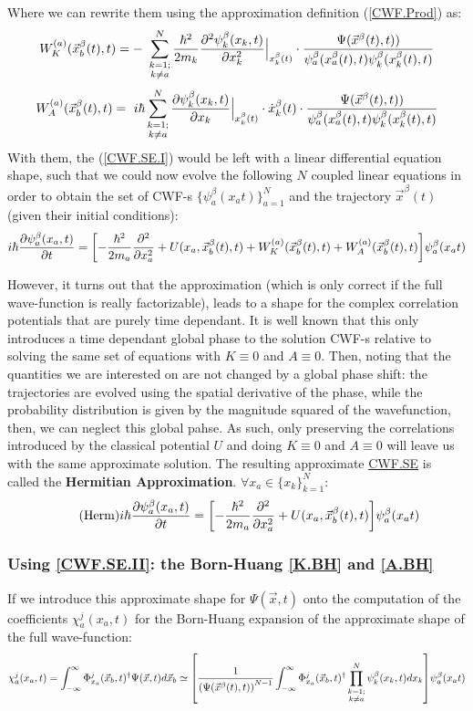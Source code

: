 \documentclass[11pt, a4paper]{article} %
\begin{document}
Where we can rewrite them using the approximation definition (\ref{CWF.Prod}) as:
$$
W^{(a)}_K(\vec{x}_b^\beta (t),t)=- \ \sum_{\substack{k=1; \\ k\neq a}}^{N} \frac{\hbar^2}{2m_k}\pdv[2]{\psi_k^\beta(x_k,t)}{x_k}\Big\rvert_{x_k^\beta(t)}\cdot\frac{\Psi(\vec{x}^\beta(t),t))}{\psi^\beta_a(x_a^\beta(t),t) \psi^\beta_k(x_k^\beta(t),t)} 
$$
$$
W^{(a)}_A(\vec{x}_b^\beta (t),t)=\ i\hbar \sum_{\substack{k=1; \\ k\neq a}}^{N} \pdv{\psi_k^\beta(x_k,t)}{x_k}\Big\rvert_{x_k^\beta(t)}\cdot \dot{x}_k^\beta(t) \cdot\frac{\Psi(\vec{x}^\beta(t),t))}{\psi^\beta_a(x_a^\beta(t),t) \psi^\beta_k(x_k^\beta(t),t)}
$$
With them, the (\ref{CWF.SE.I}) would be left with a linear differential equation shape, such that we could now evolve the following $N$ coupled linear equations in order to obtain the set of CWF-s $\{\psi_a^\beta(x_a t) \}_{a=1}^N$ and the trajectory $\vec{x}^\beta(t)$ (given their initial conditions):
$$
i\hbar \pdv{\psi_a^\beta(x_a, t)}{t} = \qty[- \frac{\hbar^2}{2m_a}\pdv[2]{}{x_a} + U(x_a, \vec{x}_b^\beta(t), t)+ W^{(a)}_K(\vec{x}_b^\beta (t),t) +W^{(a)}_A(\vec{x}_b^\beta (t),t) ]\psi_a^\beta(x_a t)
$$

However, it turns out that the approximation (which is only correct if the full wave-function is really factorizable), leads to a shape for the complex correlation potentials that are purely time dependant. It is well known that this only introduces a time dependant global phase to the solution CWF-s relative to solving the same set of equations with $K\equiv 0$ and $A \equiv 0$. Then, noting that the quantities we are interested on are not changed by a global phase shift: the trajectories are evolved using the spatial derivative of the phase, while the probability distribution is given by the magnitude squared of the wavefunction, then, we can neglect this global pahse. As such, only preserving the correlations introduced by the classical potential $U$ and doing $K\equiv 0$ and $A \equiv 0$ will leave us with the same approximate solution. The resulting approximate \hyperref[CWF.SE]{CWF.SE} is called the {\bf Hermitian Approximation}. $\forall x_a \in \{ x_k\}_{k=1}^N$:
\begin{equation}\label{Herm}\tag{Herm}
i\hbar \pdv{\psi_a^\beta(x_a, t)}{t} = \qty[- \frac{\hbar^2}{2m_a}\pdv[2]{}{x_a} + U(x_a, \vec{x}_b^\beta(t), t)]\psi_a^\beta(x_a t)
\end{equation}

\subsubsection{Using \ref{CWF.SE.II}: the Born-Huang \ref{K.BH} and \ref{A.BH}}
If we introduce this approximate shape for $\Psi(\vec{x},t)$ onto the computation of the coefficients $\chi_a^j(x_a,t)$ for the Born-Huang expansion of the approximate shape of the full wave-function:
$$
\chi_a^j(x_a,t)= \int_{-\infty}^\infty \Phi_{x_a}^j(\vec{x}_b,t)^\dagger \Psi(\vec{x},t) d\vec{x}_b \simeq \qty[\frac{1}{ \qty(\Psi(\vec{x}^\beta(t),t))^{N-1}} \int_{-\infty}^\infty \Phi_{x_a}^j(\vec{x}_b,t)^\dagger \prod_{\substack{k=1; \\ k\neq a}}^{N} \psi^\beta_k(x_k,t) dx_k ] \psi_a^\beta(x_a t)
$$
\end{document}
